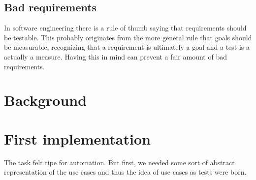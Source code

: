 \documentclass[10pt]{scrreprt}
\begin{document}
\subsection{Bad requirements}
In software engineering there is a rule of thumb saying that requirements should be testable. This probably originates from the more general rule that goals should be measurable, recognizing that a requirement is ultimately a goal and a test is a actually a measure. Having this in mind can prevent a fair amount of bad requirements.

\section{Background}


\section{First implementation}
The task felt ripe for automation. But first, we needed some sort of abstract representation of the use cases and thus the idea of use cases as tests were born.

\end{document}
